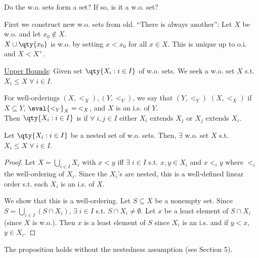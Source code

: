 \begin{question}
    Do the w.o. sets form a set? If so, is it a w.o. set?
\end{question}

\begin{answer}
    First we construct new w.o. sets from old.
    ``There is always another'': Let $X$ be w.o. and let $x_0 \not\in X$. \\
    $X \cup \qty{x_0}$ is w.o. by setting $x < x_0$ for all $x \in X$.
    This is unique up to o.i. and $X < X^+$.
\end{answer}

\underline{Upper Bounds}: Given set $\qty{X_i : i \in I}$ of w.o. sets.
We seek a w.o. set $X$ s.t. $X_i \leq X \; \forall \; i \in I$.

\begin{definition}[Extends]
    For well-orderings $(X, <_X), (Y, <_Y)$, we say that $(Y, <_Y)$  $(X, <_X)$ if $X \subseteq Y$, $\eval{<_Y}_{X} =\, <_X$, and $X$ is an i.s. of $Y$. \\
    Then $\qty{X_i : i \in I}$ is  if $\forall \; i, j \in I$ either $X_i$ extends $X_j$ or $X_j$ extends $X_i$.
\end{definition}

\begin{proposition} \label{prp:8}
    Let $\qty{X_i : i \in I}$ be a nested set of w.o. sets.
    Then, $\exists$ w.o. set $X$ s.t. $X_i \leq X \; \forall \; i \in I$.
\end{proposition}

\begin{proof}
    Let $X = \bigcup_{i \in I} X_i$ with $x < y$ iff $\exists \; i \in I$ s.t. $x, y \in X_i$ and $x <_i y$ where $<_i$ the well-ordering of $X_i$.
    Since the $X_i$'s are nested, this is a well-defined linear order s.t. each $X_i$ is an i.s. of $X$.

    We show that this is a well-ordering.
    Let $S \subseteq X$ be a nonempty set.
    Since $S = \bigcup_{i \in I} (S \cap X_i)$, $\exists \; i \in I$ s.t. $S \cap X_i \neq \emptyset$.
    Let $x$ be a least element of $S \cap X_i$ (since $X$ is w.o.).
    Then $x$ is a least element of $S$ since $X_i$ is an i.s. and if $y < x$, $y \in X_i$.
\end{proof}

\begin{remark}
    The proposition holds without the nestedness assumption (see Section 5).
\end{remark}

